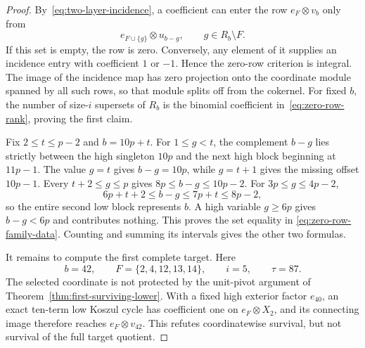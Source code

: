 \documentclass[11pt]{article}
\theoremstyle{definition}
\theoremstyle{remark}
\begin{document}
\begin{proof}
By~\eqref{eq:two-layer-incidence}, a coefficient can enter the row
$e_F\otimes v_b$ only from
\[
e_{F\cup\{g\}}\otimes u_{b-g},\qquad g\in R_b\setminus F.
\]
If this set is empty, the row is zero. Conversely, any element of it supplies an incidence entry
with coefficient $1$ or $-1$. Hence the zero-row criterion is integral. The image of the
incidence map has zero projection onto the coordinate module spanned by all such rows, so that
module splits off from the cokernel. For fixed $b$, the number of size-$i$ supersets of $R_b$
is the binomial coefficient in~\eqref{eq:zero-row-rank}, proving the first claim.

Fix $2\le t\le p-2$ and $b=10p+t$. For $1\le g<t$, the complement $b-g$ lies strictly
between the high singleton $10p$ and the next high block beginning at $11p-1$. The value
$g=t$ gives $b-g=10p$, while $g=t+1$ gives the missing offset $10p-1$. Every
$t+2\le g\le p$ gives $8p\le b-g\le10p-2$. For
$3p\le g\le4p-2$,
\[
6p+t+2\le b-g\le7p+t\le8p-2,
\]
so the entire second low block represents $b$. A high variable $g\ge6p$ gives
$b-g<6p$ and contributes nothing. This proves the set equality in
\eqref{eq:zero-row-family-data}. Counting and summing its intervals gives the other two formulas.

It remains to compute the first complete target. Here
\[
b=42,\qquad F=\{2,4,12,13,14\},\qquad i=5,\qquad\tau=87.
\]
The selected coordinate is not protected by the unit-pivot argument of
Theorem~\ref{thm:first-surviving-lower}. With a fixed high
exterior factor $e_{40}$, an exact ten-term low Koszul cycle has coefficient one on
$e_F\otimes X_2$, and its connecting image therefore reaches $e_F\otimes v_{42}$.
This refutes coordinatewise survival, but not survival of the full target quotient.


\end{proof}
\end{document}
